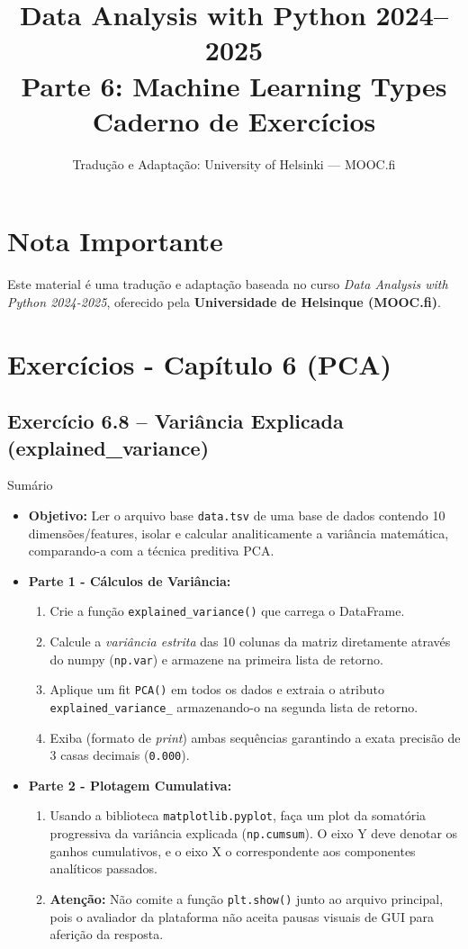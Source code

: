 \documentclass[11pt,a4paper]{article}
\title{\textbf{Data Analysis with Python 2024--2025}\\Parte 6: Machine Learning Types\\\large Caderno de Exercícios}
\author{Tradução e Adaptação: University of Helsinki --- MOOC.fi}
\date{}
\begin{document}
\maketitle

\section*{Nota Importante}
Este material é uma tradução e adaptação baseada no curso \textit{Data Analysis with Python 2024-2025}, oferecido pela \textbf{Universidade de Helsinque (MOOC.fi)}.

\tableofcontents
\newpage

\section{Exercícios - Capítulo 6 (PCA)}

\subsection*{Exercício 6.8 -- Variância Explicada (explained\_variance)}

\begin{exercicio}{Sumário}
\begin{itemize}
    \item \textbf{Objetivo:} Ler o arquivo base \texttt{data.tsv} de uma base de dados contendo 10 dimensões/features, isolar e calcular analiticamente a variância matemática, comparando-a com a técnica preditiva PCA.
    \item \textbf{Parte 1 - Cálculos de Variância:}
    \begin{enumerate}
        \item Crie a função \texttt{explained\_variance()} que carrega o DataFrame.
        \item Calcule a \textit{variância estrita} das 10 colunas da matriz diretamente através do numpy (\texttt{np.var}) e armazene na primeira lista de retorno.
        \item Aplique um fit \texttt{PCA()} em todos os dados e extraia o atributo \texttt{explained\_variance\_} armazenando-o na segunda lista de retorno.
        \item Exiba (formato de \textit{print}) ambas sequências garantindo a exata precisão de 3 casas decimais (\texttt{0.000}).
    \end{enumerate}
    \item \textbf{Parte 2 - Plotagem Cumulativa:}
    \begin{enumerate}
        \item Usando a biblioteca \texttt{matplotlib.pyplot}, faça um plot da somatória progressiva da variância explicada (\texttt{np.cumsum}). O eixo Y deve denotar os ganhos cumulativos, e o eixo X o correspondente aos componentes analíticos passados.
        \item \textbf{Atenção:} Não comite a função \texttt{plt.show()} junto ao arquivo principal, pois o avaliador da plataforma não aceita pausas visuais de GUI para aferição da resposta.
    \end{enumerate}
\end{itemize}
\end{exercicio}
\end{document}
